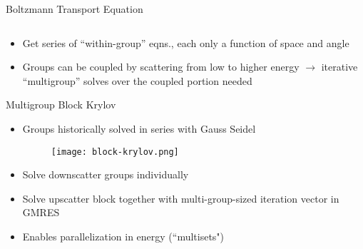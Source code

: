 \documentclass[final]{beamer}
\begin{document}
\begin{frame}{}
\begin{columns}[t]
\begin{column}{.3\linewidth}
\begin{block}{\large Boltzmann Transport Equation}
\begin{itemize}
\begin{equation}
              \label{eq:OperatorEvalForm}
            \end{equation}
            \item{Get series of ``within-group'' eqns., each only a function of space
             and angle}
            \item{Groups can be coupled by scattering from low to higher energy
             $\rightarrow$ iterative ``multigroup'' solves over the coupled portion needed}
			\end{itemize}
    			\end{block}
    	\vfill
        	\begin{block}{\large Multigroup Block Krylov}		
		\begin{itemize}
		\item{Groups historically solved in series with Gauss Seidel} 
			\begin{figure}[h!]
			\centering
	      		\texttt{[image: block-krylov.png]}
			\end{figure}
		\item{Solve downscatter groups individually}
		\item{Solve upscatter block together with multi-group-sized iteration vector 
		      in GMRES}
		\item{Enables parallelization in energy (``multisets") \cite{Davidson2013}}
		\end{itemize}
        	\end{block}
    	\end{column}



\end{columns}
\end{frame}
\end{document}
